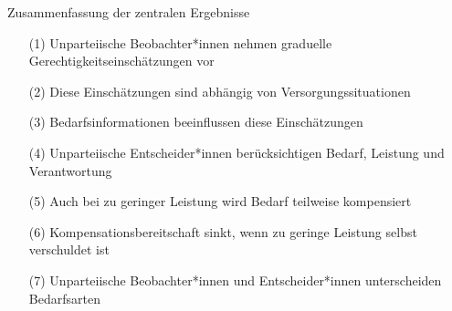 \documentclass[xcolor=table,9pt,aspectratio=169]{beamer}
\begin{document}
\begin{frame}{\vspace*{10mm}Zusammenfassung der zentralen Ergebnisse}
\vspace*{-10mm}
\begin{itemize}
   \item[(1)] Unparteiische Beobachter*innen nehmen graduelle Gerechtigkeitseinschätzungen vor
   \item[(2)] Diese Einschätzungen sind abhängig von Versorgungssituationen
   \item[(3)] Bedarfsinformationen beeinflussen diese Einschätzungen
\end{itemize}

\vspace{1em}
\begin{itemize}
   \item[(4)] Unparteiische Entscheider*innen berücksichtigen Bedarf, Leistung und Verantwortung
   \item[(5)] Auch bei zu geringer Leistung wird Bedarf teilweise kompensiert
   \item[(6)] Kompensationsbereitschaft sinkt, wenn zu geringe Leistung selbst verschuldet ist
\end{itemize}

\vspace{1em}
\begin{itemize}
   \item[(7)] Unparteiische Beobachter*innen und Entscheider*innen unterscheiden Bedarfsarten
\end{itemize}
\end{frame}
\end{document}
